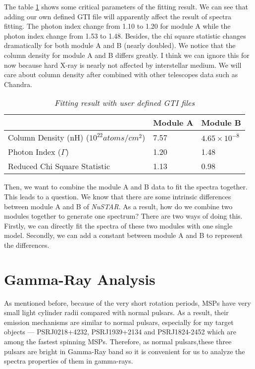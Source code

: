 \documentclass[12pt]{report}
\newcommand{\mycaption}[1]{\caption{\textit{\footnotesize #1}}}
\begin{document}
          \indent The table \ref{table:spectra_usrgti} shows some critical parameters of the fitting result. 
          We can see that adding our own defined GTI file will apparently affect the result of spectra fitting. 
          The photon index change from 1.10 to 1.20 for module A while the photon index change from 1.53 to 
          1.48. Besides, the chi square statistic changes dramatically for both module A and B (nearly doubled).
          We notice that the column density for module A and B differs greatly. 
          I think we can ignore this for now because hard X-ray is nearly not affected by
          interstellar medium. We will care about column density after combined with other telescopes data such 
          as Chandra. 
          \begin{table}[!h]   
            \centering
            \begin{tabular}{| m{4cm} | m{3cm} | m{3cm} |}
              \hline
              & Module A & Module B \\
              \hline
              Column Density (nH) ($10^{22} atoms/cm^2$) & 7.57 & $4.65\times10^{-8}$\\ 
              \hline
              Photon Index ($\Gamma$) & 1.20 & 1.48 \\
              \hline 
              Reduced Chi Square Statistic & 1.13 & 0.98 \\
              \hline 
            \end{tabular}
            \mycaption{Fitting result with user defined GTI files}
            \label{table:spectra_usrgti}
          \end{table}

          Then, we want to combine the module A and B data to fit the spectra together. This leads to a question.
          We know that there are some intrinsic differences between module A and B of \textit{NuSTAR}. As a result,
          how do we combine two modules together to generate one spectrum? There are two ways of doing this. Firstly,
          we can directly fit the spectra of these two modules with one single model. Secondly, we can add a 
          constant between module A and B to represent the differences. %

  \chapter{Gamma-Ray Analysis}
      As mentioned before, because of the very short rotation periods, MSPs have very small light cylinder radii 
      compared with normal pulsars. As a result, their emission mechanisms are similar to normal pulsars, 
      especially for my target objects --- PSRJ0218+4232, PSRJ1939+2134 and PSRJ1824-2452
      which are among the fastest spinning MSPs. Therefore, as normal pulsars,these three 
      pulsars are bright in Gamma-Ray band so it is convenient for us to analyze the spectra 
      properties of them in gamma-rays.
\end{document}
